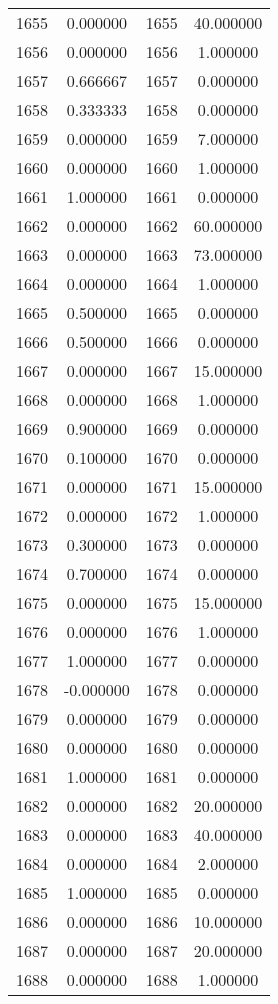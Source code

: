 \documentclass[12pt]{article}
\begin{document}
\begin{longtable}{@{}cccc@{}}
1655 & 0.000000 & 1655 & 40.000000 \\
1656 & 0.000000 & 1656 & 1.000000 \\
1657 & 0.666667 & 1657 & 0.000000 \\
1658 & 0.333333 & 1658 & 0.000000 \\
1659 & 0.000000 & 1659 & 7.000000 \\
1660 & 0.000000 & 1660 & 1.000000 \\
1661 & 1.000000 & 1661 & 0.000000 \\
1662 & 0.000000 & 1662 & 60.000000 \\
1663 & 0.000000 & 1663 & 73.000000 \\
1664 & 0.000000 & 1664 & 1.000000 \\
1665 & 0.500000 & 1665 & 0.000000 \\
1666 & 0.500000 & 1666 & 0.000000 \\
1667 & 0.000000 & 1667 & 15.000000 \\
1668 & 0.000000 & 1668 & 1.000000 \\
1669 & 0.900000 & 1669 & 0.000000 \\
1670 & 0.100000 & 1670 & 0.000000 \\
1671 & 0.000000 & 1671 & 15.000000 \\
1672 & 0.000000 & 1672 & 1.000000 \\
1673 & 0.300000 & 1673 & 0.000000 \\
1674 & 0.700000 & 1674 & 0.000000 \\
1675 & 0.000000 & 1675 & 15.000000 \\
1676 & 0.000000 & 1676 & 1.000000 \\
1677 & 1.000000 & 1677 & 0.000000 \\
1678 & -0.000000 & 1678 & 0.000000 \\
1679 & 0.000000 & 1679 & 0.000000 \\
1680 & 0.000000 & 1680 & 0.000000 \\
1681 & 1.000000 & 1681 & 0.000000 \\
1682 & 0.000000 & 1682 & 20.000000 \\
1683 & 0.000000 & 1683 & 40.000000 \\
1684 & 0.000000 & 1684 & 2.000000 \\
1685 & 1.000000 & 1685 & 0.000000 \\
1686 & 0.000000 & 1686 & 10.000000 \\
1687 & 0.000000 & 1687 & 20.000000 \\
1688 & 0.000000 & 1688 & 1.000000 \\

\end{longtable}
\end{document}
